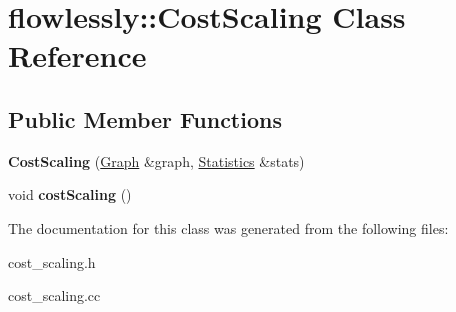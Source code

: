 \hypertarget{classflowlessly_1_1CostScaling}{\section{flowlessly\-:\-:\-Cost\-Scaling \-Class \-Reference}
\label{classflowlessly_1_1CostScaling}
}
\subsection*{\-Public \-Member \-Functions}
\begin{DoxyCompactItemize}
\item 
\hypertarget{classflowlessly_1_1CostScaling_ae26385291451888135cb75c978ab02de}{{\bfseries \-Cost\-Scaling} (\hyperlink{classflowlessly_1_1Graph}{\-Graph} \&graph, \hyperlink{classflowlessly_1_1Statistics}{\-Statistics} \&stats)}\label{classflowlessly_1_1CostScaling_ae26385291451888135cb75c978ab02de}

\item 
\hypertarget{classflowlessly_1_1CostScaling_a8536fd7949d73e3472bc7f08abdd199b}{void {\bfseries cost\-Scaling} ()}\label{classflowlessly_1_1CostScaling_a8536fd7949d73e3472bc7f08abdd199b}

\end{DoxyCompactItemize}


\-The documentation for this class was generated from the following files\-:\begin{DoxyCompactItemize}
\item 
cost\-\_\-scaling.\-h\item 
cost\-\_\-scaling.\-cc\end{DoxyCompactItemize}
